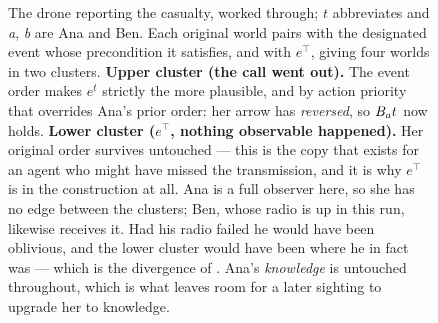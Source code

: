 \documentclass[11pt,a4paper]{article}
\begin{document}
\begin{figure}[t]
\centering
{}
\caption{The drone reporting the casualty, worked through; $t$ abbreviates
 and \emph{a}, \emph{b} are Ana and Ben. Each original world pairs with the
designated event whose precondition it satisfies, and with $e^{\top}$, giving four worlds in
two clusters. \textbf{Upper cluster (the call went out).} The event order makes $e^{t}$
strictly the more plausible, and by action priority that overrides Ana's prior order: her
arrow has \emph{reversed}, so $B_{a}t$ now holds. \textbf{Lower cluster ($e^{\top}$,
nothing observable happened).} Her original order survives untouched --- this is the copy
that exists for an agent who might have missed the transmission, and it is why $e^{\top}$ is
in the construction at all. Ana is a full observer here, so she has no edge between the
clusters; Ben, whose radio is up in this run, likewise receives it. Had his radio failed he
would have been oblivious, and the lower cluster would have been where he in fact was ---
which is the divergence of . Ana's \emph{knowledge} is untouched throughout,
which is what leaves room for a later sighting to upgrade her to knowledge.}
\label{fig:update}
\end{figure}
\end{document}

